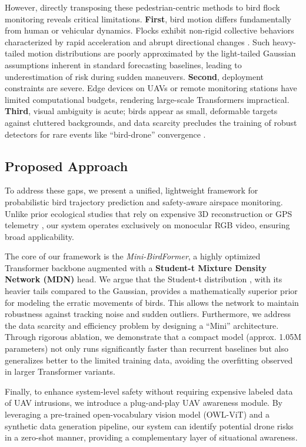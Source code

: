 \documentclass[journal]{IEEEtran}
\begin{document}
	However, directly transposing these pedestrian-centric methods to bird flock monitoring reveals critical limitations. \textbf{First}, bird motion differs fundamentally from human or vehicular dynamics. Flocks exhibit non-rigid collective behaviors characterized by rapid acceleration and abrupt directional changes \cite{Ballerini2008Interaction}. Such heavy-tailed motion distributions are poorly approximated by the light-tailed Gaussian assumptions inherent in standard forecasting baselines, leading to underestimation of risk during sudden maneuvers. \textbf{Second}, deployment constraints are severe. Edge devices on UAVs or remote monitoring stations have limited computational budgets, rendering large-scale Transformers impractical. \textbf{Third}, visual ambiguity is acute; birds appear as small, deformable targets against cluttered backgrounds, and data scarcity precludes the training of robust detectors for rare events like ``bird-drone'' convergence \cite{Chen2020BirdUAV}.
	
	\subsection{Proposed Approach}
	To address these gaps, we present a unified, lightweight framework for probabilistic bird trajectory prediction and safety-aware airspace monitoring. Unlike prior ecological studies that rely on expensive 3D reconstruction or GPS telemetry \cite{Nagelkerke2018Flight}, our system operates exclusively on monocular RGB video, ensuring broad applicability.
	
	The core of our framework is the \textit{Mini-BirdFormer}, a highly optimized Transformer backbone augmented with a \textbf{Student-t Mixture Density Network (MDN)} head. We argue that the Student-t distribution \cite{Bishop1994MDN}, with its heavier tails compared to the Gaussian, provides a mathematically superior prior for modeling the erratic movements of birds. This allows the network to maintain robustness against tracking noise and sudden outliers. Furthermore, we address the data scarcity and efficiency problem by designing a ``Mini'' architecture. Through rigorous ablation, we demonstrate that a compact model (approx. 1.05M parameters) not only runs significantly faster than recurrent baselines but also generalizes better to the limited training data, avoiding the overfitting observed in larger Transformer variants.
	
	Finally, to enhance system-level safety without requiring expensive labeled data of UAV intrusions, we introduce a plug-and-play UAV awareness module. By leveraging a pre-trained open-vocabulary vision model (OWL-ViT) \cite{Minderer2022OWLViT} and a synthetic data generation pipeline, our system can identify potential drone risks in a zero-shot manner, providing a complementary layer of situational awareness.
	
\end{document}
